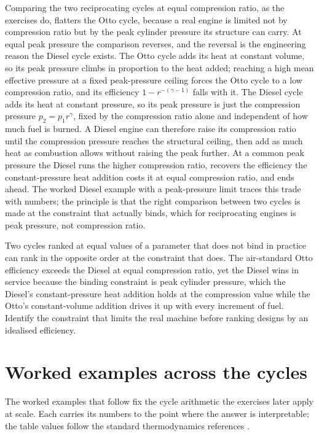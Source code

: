 Comparing the two reciprocating cycles at equal compression ratio, as the
exercises do, flatters the Otto cycle, because a real engine is limited not
by compression ratio but by the peak cylinder pressure its structure can
carry. At equal peak pressure the comparison reverses, and the reversal is
the engineering reason the Diesel cycle exists. The Otto cycle adds its heat
at constant volume, so its peak pressure climbs in proportion to the heat
added; reaching a high mean effective pressure at a fixed peak-pressure
ceiling forces the Otto cycle to a low compression ratio, and its efficiency
$1 - r^{-(\gamma-1)}$ falls with it. The Diesel cycle adds its heat at
constant pressure, so its peak pressure is just the compression pressure
$p_2 = p_1 r^\gamma$, fixed by the compression ratio alone and independent of
how much fuel is burned. A Diesel engine can therefore raise its compression
ratio until the compression pressure reaches the structural ceiling, then add
as much heat as combustion allows without raising the peak further. At a
common peak pressure the Diesel runs the higher compression ratio, recovers
the efficiency the constant-pressure heat addition costs it at equal
compression ratio, and ends ahead. The worked Diesel example with a peak-pressure
limit traces this trade with numbers; the principle is that the right
comparison between two cycles is made at the constraint that actually binds,
which for reciprocating engines is peak pressure, not compression ratio.

\begin{principle}
Two cycles ranked at equal values of a parameter that does not bind in
practice can rank in the opposite order at the constraint that does. The
air-standard Otto efficiency exceeds the Diesel at equal compression ratio,
yet the Diesel wins in service because the binding constraint is peak
cylinder pressure, which the Diesel's constant-pressure heat addition holds
at the compression value while the Otto's constant-volume addition drives it
up with every increment of fuel. Identify the constraint that limits the real
machine before ranking designs by an idealised efficiency.
\end{principle}

\section{Worked examples across the cycles}

The worked examples that follow fix the cycle arithmetic the exercises
later apply at scale. Each carries its numbers to the point where the
answer is interpretable; the table values follow the standard
thermodynamics references \cite{text:cengel-boles,
text:moran-shapiro-thermo}.

